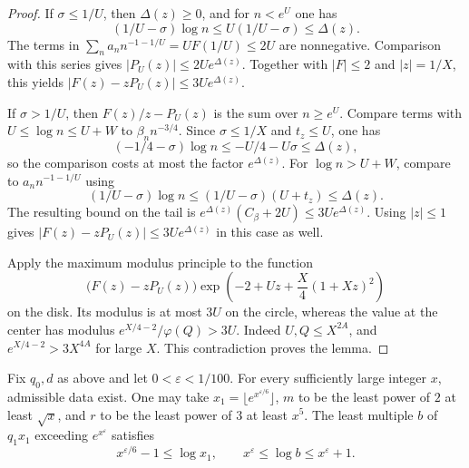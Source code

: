 \begin{proof}
If \(\sigma\le1/U\), then \(\Delta(z)\ge0\), and for \(n<e^U\) one has
\[
 (1/U-\sigma)\log n\le U(1/U-\sigma)\le\Delta(z).
\]
The terms in \(\sum_n a_n n^{-1-1/U}=UF(1/U)\le2U\) are nonnegative.
Comparison with this series gives \(|P_U(z)|\le2Ue^{\Delta(z)}\).
Together with \(|F|\le2\) and \(|z|=1/X\), this yields
\(|F(z)-zP_U(z)|\le3Ue^{\Delta(z)}\).

If \(\sigma>1/U\), then \(F(z)/z-P_U(z)\) is the sum over \(n\ge e^U\).
Compare terms with \(U\le\log n\le U+W\) to \(\beta_n n^{-3/4}\).
Since \(\sigma\le1/X\) and \(t_z\le U\), one has
\[
 (-1/4-\sigma)\log n\le -U/4-U\sigma\le\Delta(z),
\]
so the comparison costs at most the factor \(e^{\Delta(z)}\).
For \(\log n>U+W\), compare to \(a_n n^{-1-1/U}\) using
\[
 (1/U-\sigma)\log n
       \le(1/U-\sigma)(U+t_z)\le\Delta(z).
\]
The resulting bound on the tail is
\(e^{\Delta(z)}(C_\beta+2U)\le3Ue^{\Delta(z)}\).
Using \(|z|\le1\) gives
\(|F(z)-zP_U(z)|\le3Ue^{\Delta(z)}\) in this case as well.

Apply the maximum modulus principle to the function
\[
 \bigl(F(z)-zP_U(z)\bigr)\exp\!\left(-2+Uz+\frac X4(1+Xz)^2\right)
\]
on the disk. Its modulus is at most \(3U\) on the circle, whereas the value
at the center has modulus \(e^{X/4-2}/\varphi(Q)>3U\).
Indeed \(U,Q\le X^{2A}\), and \(e^{X/4-2}>3X^{4A}\) for large \(X\).
This contradiction proves the lemma.
\end{proof}

\begin{proposition}\label{prop:admissible-data}
Fix \(q_0,d\) as above and let \(0<\varepsilon<1/100\).
For every sufficiently large integer \(x\), admissible data exist.
One may take \(x_1=\lfloor e^{x^{\varepsilon/6}}\rfloor\), \(m\) to be the
least power of \(2\) at least \(\sqrt{x}\), and \(r\) to be the least power
of \(3\) at least \(x^5\).
The least multiple \(b\) of \(q_1x_1\) exceeding \(e^{x^\varepsilon}\) satisfies
\[
 x^{\varepsilon/6}-1\le\log x_1,\qquad
 x^\varepsilon\le\log b\le x^\varepsilon+1.
\]
\end{proposition}

